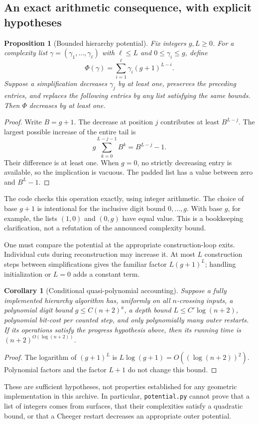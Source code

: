 \documentclass[11pt]{article}
\newtheorem{proposition}[theorem]{Proposition}
\newtheorem{corollary}[theorem]{Corollary}
\theoremstyle{definition}
\newcommand{\code}[1]{\texttt{#1}}
\begin{document}
\subsection{An exact arithmetic consequence, with explicit hypotheses}
\begin{proposition}[Bounded hierarchy potential]
Fix integers $g,L\geq0$. For a complexity list
$\gamma=(\gamma_1,\ldots,\gamma_\ell)$ with $\ell\leq L$ and
$0\leq\gamma_i\leq g$, define
\[
 \Phi(\gamma)=\sum_{i=1}^{\ell}\gamma_i(g+1)^{L-i}.
\]
Suppose a simplification decreases $\gamma_j$ by at least one, preserves the
preceding entries, and replaces the following entries by any list satisfying
the same bounds. Then $\Phi$ decreases by at least one.
\end{proposition}
\begin{proof}
Write $B=g+1$. The decrease at position $j$ contributes at least $B^{L-j}$.
The largest possible increase of the entire tail is
\[
 g\sum_{k=0}^{L-j-1}B^k=B^{L-j}-1.
\]
Their difference is at least one. When $g=0$, no strictly decreasing entry is
available, so the implication is vacuous. The padded list has a value between
zero and $B^L-1$.
\end{proof}
The code checks this operation exactly, using integer arithmetic. The choice
of base $g+1$ is intentional for the inclusive digit bound $0,\ldots,g$.
With base $g$, for example, the lists $(1,0)$ and $(0,g)$ have equal value.
This is a bookkeeping clarification, not a refutation of the announced
complexity bound.

One must compare the potential at the appropriate construction-loop exits.
Individual cuts during reconstruction may increase it. At most $L$
construction steps between simplifications gives the familiar factor
$L(g+1)^L$; handling initialization or $L=0$ adds a constant term.

\begin{corollary}[Conditional quasi-polynomial accounting]
Suppose a fully implemented hierarchy algorithm has, uniformly on all
$n$-crossing inputs, a polynomial digit bound $g\leq C(n+2)^a$, a depth bound
$L\leq C'\log(n+2)$, polynomial bit-cost per counted step, and only
polynomially many outer restarts. If its operations satisfy the progress
hypothesis above, then its running time is $(n+2)^{O(\log(n+2))}$.
\end{corollary}
\begin{proof}
The logarithm of $(g+1)^L$ is
$L\log(g+1)=O((\log(n+2))^2)$. Polynomial factors and the factor $L+1$ do not
change this bound.
\end{proof}
These are sufficient hypotheses, not properties established for any
geometric implementation in this archive. In particular, \code{potential.py}
cannot prove that a list of integers comes from surfaces, that their
complexities satisfy a quadratic bound, or that a Cheeger restart decreases
an appropriate outer potential.
\end{document}

